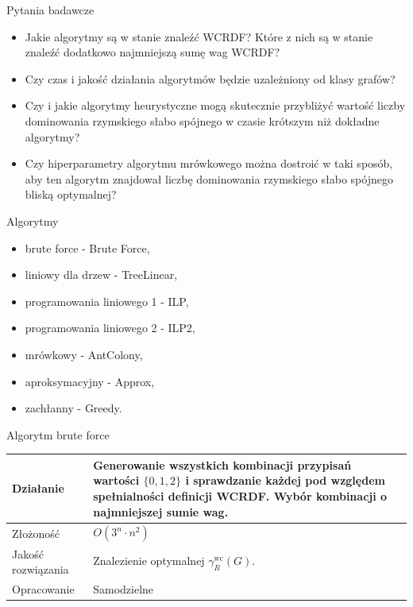 \documentclass[polish,aspectratio=169]{beamer}
\begin{document}
\begin{frame}{Pytania badawcze}
    \begin{itemize}
        \item Jakie algorytmy są w stanie znaleźć WCRDF? Które z nich są w stanie znaleźć dodatkowo najmniejszą sumę wag WCRDF?
        \item Czy czas i jakość działania algorytmów będzie uzależniony od klasy grafów?
        \item Czy i jakie algorytmy heurystyczne mogą skutecznie przybliżyć wartość liczby dominowania rzymskiego słabo spójnego w czasie krótszym niż dokładne algorytmy?
        \item Czy hiperparametry algorytmu mrówkowego można dostroić w taki sposób, aby ten algorytm znajdował liczbę dominowania rzymskiego słabo spójnego bliską optymalnej?
    \end{itemize}
\end{frame}

\begin{frame}{Algorytmy}
    \begin{itemize}
        \item brute force - Brute Force,
        \item liniowy dla drzew - TreeLinear,
        \item programowania liniowego 1 - ILP,
        \item programowania liniowego 2 - ILP2,
        \item mrówkowy - AntColony,
        \item aproksymacyjny - Approx,
        \item zachłanny - Greedy.
    \end{itemize}
\end{frame}

\begin{frame}{Algorytm brute force}
    \begin{table}
        \centering
        \begin{tabular}{|p{4cm}|p{10cm}|}
        \hline
        Działanie & Generowanie wszystkich kombinacji przypisań wartości $\{0,1,2\}$ i sprawdzanie każdej pod względem spełnialności definicji WCRDF. Wybór kombinacji o najmniejszej sumie wag.  \\
        \hline
        Złożoność & $O(3^n \cdot n^2)$  \\
        \hline
        Jakość rozwiązania & Znalezienie optymalnej $\gamma^{\mathrm{wc}}_R(G)$.\\
        \hline
        Opracowanie & Samodzielne  \\
        \hline
        \end{tabular}
        \label{tab:brute_force}
    \end{table}
\end{frame}
\end{document}
